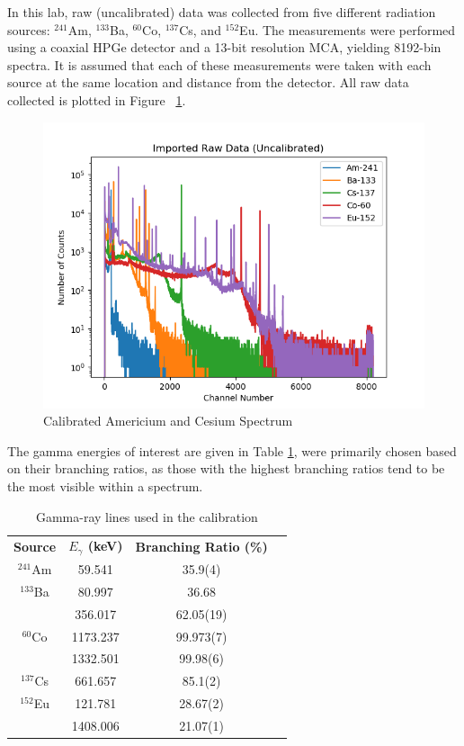 In this lab, raw (uncalibrated) data was collected from five different
radiation sources:  $^{241}$Am, $^{133}$Ba, $^{60}$Co, $^{137}$Cs, and $^{152}$Eu.
The measurements were performed using a coaxial HPGe detector and a 13-bit resolution MCA,
yielding 8192-bin spectra. It is assumed that each of these measurements were
taken with each source at the same location and distance from the detector.
All raw data collected is plotted in Figure ~\ref{fig:raw}.



\begin{figure}[H]
\begin{center}
\includegraphics[width=.7\linewidth]{../images/rawdata.png}
\caption{Calibrated Americium and Cesium Spectrum
\label{fig:raw}}
\end{center}

\end{figure}


The gamma energies of interest are given in Table
\ref{tab:src}, were primarily chosen based on their
branching ratios, as those with the highest branching ratios tend to be
the most visible within a spectrum.

\begin{table}[H]
  \begin{center}
    \begin{tabular}{cccc}
      \textbf{Source} & \textbf{$E_{\gamma}$ (keV)} & \textbf{Branching Ratio (\%)} \\
      $^{241}$Am    &  59.541   &    35.9(4)    \\
      $^{133}$Ba    &  80.997   &     36.68   \\
                    &  356.017   &      62.05(19) \\
      $^{60}$Co     &  1173.237  &    99.973(7)   \\
                    &  1332.501  &     99.98(6)  \\
      $^{137}$Cs    &  661.657   &      85.1(2) \\
      $^{152}$Eu    &  121.781   &     28.67(2)  \\
                    &  1408.006  &      21.07(1) \\
    \end{tabular}
    \caption{Gamma-ray lines used in the calibration}
    \label{tab:src}
  \end{center}
\end{table}

